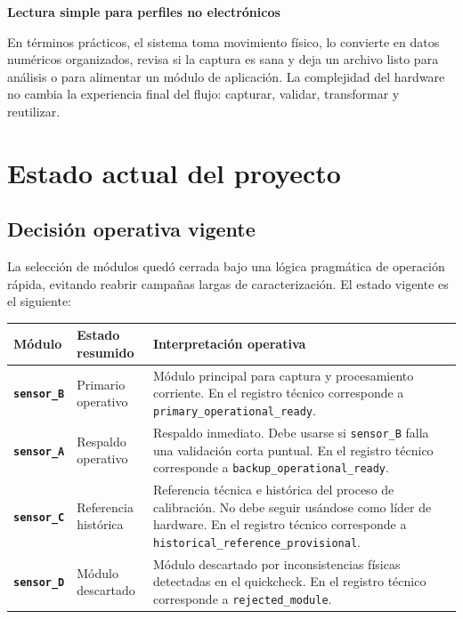 \documentclass[11pt,a4paper]{article}
\begin{document}
\begin{infobox}
\textbf{Lectura simple para perfiles no electrónicos}\par
En términos prácticos, el sistema toma movimiento físico, lo convierte en datos numéricos organizados, revisa si la captura es sana y deja un archivo listo para análisis o para alimentar un módulo de aplicación. La complejidad del hardware no cambia la experiencia final del flujo: capturar, validar, transformar y reutilizar.
\end{infobox}

\section{Estado actual del proyecto}

\subsection{Decisión operativa vigente}

La selección de módulos quedó cerrada bajo una lógica pragmática de operación rápida, evitando reabrir campañas largas de caracterización. El estado vigente es el siguiente:

\begin{center}
\renewcommand{\arraystretch}{1.35}
\begin{tabularx}{\textwidth}{>{\bfseries}p{2.4cm}p{3.2cm}X}
\toprule
Módulo & Estado resumido & Interpretación operativa \\
\midrule
\texttt{sensor\_B} & Primario operativo & Módulo principal para captura y procesamiento corriente. En el registro técnico corresponde a \texttt{primary\_operational\_ready}. \\
\texttt{sensor\_A} & Respaldo operativo & Respaldo inmediato. Debe usarse si \texttt{sensor\_B} falla una validación corta puntual. En el registro técnico corresponde a \texttt{backup\_operational\_ready}. \\
\texttt{sensor\_C} & Referencia histórica & Referencia técnica e histórica del proceso de calibración. No debe seguir usándose como líder de hardware. En el registro técnico corresponde a \texttt{historical\_reference\_provisional}. \\
\texttt{sensor\_D} & Módulo descartado & Módulo descartado por inconsistencias físicas detectadas en el quickcheck. En el registro técnico corresponde a \texttt{rejected\_module}. \\
\bottomrule
\end{tabularx}
\end{center}
\end{document}

